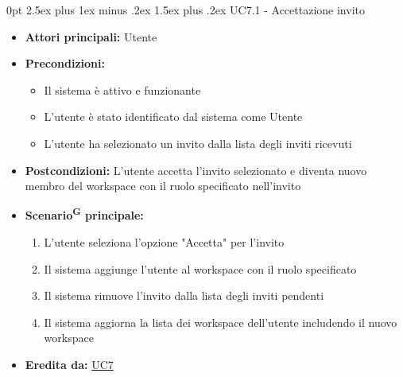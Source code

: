 \documentclass[a4paper, 11pt]{article}
\makeatletter
\renewcommand\paragraph{\@startsection{paragraph}{4}
  {0pt}
  {2.5ex plus 1ex minus .2ex}
  {1.5ex plus .2ex}
  {\normalfont\normalsize\bfseries\color{AccentDark}}}
\makeatother
\begin{document}
\paragraph{UC7.1 - Accettazione invito}\label{UC7.1}
\begin{itemize}
	\item \textbf{Attori principali:} Utente
	\item \textbf{Precondizioni:}
	\begin{itemize}
		\item Il sistema è attivo e funzionante
		\item L'utente è stato identificato dal sistema come Utente
        \item L'utente ha selezionato un invito dalla lista degli inviti ricevuti
	\end{itemize}
    \item \textbf{Postcondizioni:} L'utente accetta l'invito selezionato e diventa nuovo membro del workspace con il ruolo specificato nell'invito
	\item \textbf{Scenario\textsuperscript{G} principale:}
    \begin{enumerate}
        \item L'utente seleziona l'opzione "Accetta" per l'invito
        \item Il sistema aggiunge l'utente al workspace con il ruolo specificato
        \item Il sistema rimuove l'invito dalla lista degli inviti pendenti
        \item Il sistema aggiorna la lista dei workspace dell'utente includendo il nuovo workspace
    \end{enumerate}
    \item \textbf{Eredita da:} \hyperref[UC7]{UC7}
\end{itemize}
\end{document}
